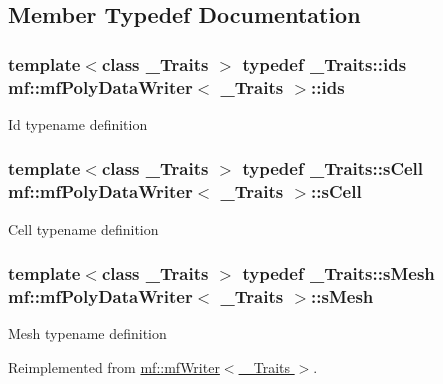 \subsection{Member Typedef Documentation}
\hypertarget{classmf_1_1mfPolyDataWriter_ae7e024a913c218669ede149f7771f85e}{
\subsubsection[{ids}]{\setlength{\rightskip}{0pt plus 5cm}template$<$class \_\-Traits $>$ typedef \_\-Traits::ids {\bf mf::mfPolyDataWriter}$<$ \_\-Traits $>$::{\bf ids}}}
\label{classmf_1_1mfPolyDataWriter_ae7e024a913c218669ede149f7771f85e}
Id typename definition \hypertarget{classmf_1_1mfPolyDataWriter_a271a825b5446e6c388a238e577840920}{
\subsubsection[{sCell}]{\setlength{\rightskip}{0pt plus 5cm}template$<$class \_\-Traits $>$ typedef \_\-Traits::sCell {\bf mf::mfPolyDataWriter}$<$ \_\-Traits $>$::{\bf sCell}}}
\label{classmf_1_1mfPolyDataWriter_a271a825b5446e6c388a238e577840920}
Cell typename definition \hypertarget{classmf_1_1mfPolyDataWriter_a4ce58a6aa7139b3d903cc453c4585e6f}{
\subsubsection[{sMesh}]{\setlength{\rightskip}{0pt plus 5cm}template$<$class \_\-Traits $>$ typedef \_\-Traits::sMesh {\bf mf::mfPolyDataWriter}$<$ \_\-Traits $>$::{\bf sMesh}}}
\label{classmf_1_1mfPolyDataWriter_a4ce58a6aa7139b3d903cc453c4585e6f}
Mesh typename definition 

Reimplemented from \hyperlink{classmf_1_1mfWriter}{mf::mfWriter$<$ \_\-Traits $>$}.

